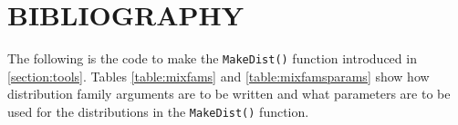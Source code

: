 \documentclass[11pt,notitlepage]{isuthesis}
\begin{document}
% 
% 
% 
% 
% 
%




% 
% 

% 
%     


\clearpage
\nocite{*}
\unappendixtitle
\newpage
{}
{}
\section*{BIBLIOGRAPHY}

\vspace{-20pt}
\begingroup
   \setlength{\bibsep}{14.5pt}
   \linespread{1}\selectfont

\endgroup

\appendix

\label{section:append}


The following is the code to make the \texttt{MakeDist()} function introduced 
in \ref{section:tools}. Tables \ref{table:mixfams} and \ref{table:mixfamsparams}
show how distribution family arguments are to be written and what parameters are
to be used for the distributions in the \texttt{MakeDist()} function.
\end{document}

